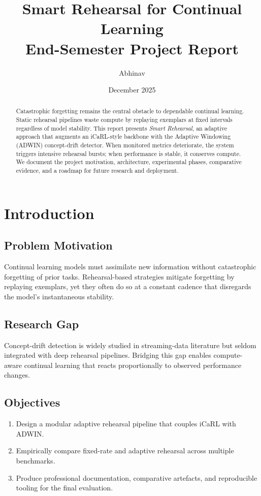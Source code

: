 \documentclass[12pt,a4paper]{article}
\title{Smart Rehearsal for Continual Learning\\End-Semester Project Report}
\author{Abhinav}
\date{December 2025}
\begin{document}
\maketitle

\begin{abstract}
Catastrophic forgetting remains the central obstacle to dependable continual learning. Static rehearsal pipelines waste compute by replaying exemplars at fixed intervals regardless of model stability. This report presents \emph{Smart Rehearsal}, an adaptive approach that augments an iCaRL-style backbone with the Adaptive Windowing (ADWIN) concept-drift detector. When monitored metrics deteriorate, the system triggers intensive rehearsal bursts; when performance is stable, it conserves compute. We document the project motivation, architecture, experimental phases, comparative evidence, and a roadmap for future research and deployment.
\end{abstract}

\tableofcontents
\newpage

\section{Introduction}
\subsection{Problem Motivation}
Continual learning models must assimilate new information without catastrophic forgetting of prior tasks. Rehearsal-based strategies mitigate forgetting by replaying exemplars, yet they often do so at a constant cadence that disregards the model's instantaneous stability.

\subsection{Research Gap}
Concept-drift detection is widely studied in streaming-data literature but seldom integrated with deep rehearsal pipelines. Bridging this gap enables compute-aware continual learning that reacts proportionally to observed performance changes.

\subsection{Objectives}
\begin{enumerate}[label=\textbf{O\arabic*}]
    \item Design a modular adaptive rehearsal pipeline that couples iCaRL with ADWIN.
    \item Empirically compare fixed-rate and adaptive rehearsal across multiple benchmarks.
    \item Produce professional documentation, comparative artefacts, and reproducible tooling for the final evaluation.
\end{enumerate}
\end{document}
